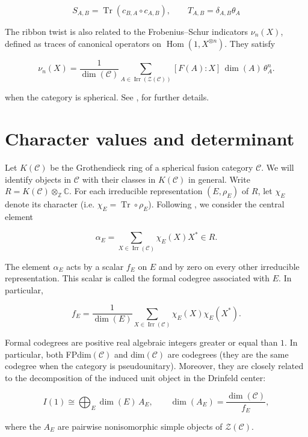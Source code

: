 \documentclass[a4paper,twoside,11pt]{amsart}
\theoremstyle{plain} %
\theoremstyle{definition}
\begin{document}
$$
S_{A,B}=\operatorname{Tr}(c_{B,A}\circ c_{A,B}),
\qquad
T_{A,B}=\delta_{A,B}\theta_A
$$


The ribbon twist is also related to the Frobenius--Schur indicators $\nu_n(X)$, defined as traces of canonical operators on $\operatorname{Hom}(1,X^{\otimes n})$. They satisfy

$$
\nu_n(X)=\frac{1}{\dim(\mathcal{C})}
\sum_{A\in\operatorname{Irr}(\mathcal{Z}(\mathcal{C}))}
[F(A):X]\,\dim(A)\,\theta_A^n.
$$
\medskip

when the category is spherical. See \cite{EGNO}, \cite{NS} for further details.




\section{Character values and determinant}

Let $K(\mathcal{C})$ be the Grothendieck ring of a spherical fusion category $\mathcal{C}$. We will identify objects in $\mathcal{C}$ with their classes in $K(\mathcal{C})$ in general. Write $R=K(\mathcal{C})\otimes_{\mathbb{Z}}\mathbb{C}$.  For each irreducible representation $(E,\rho_E)$ of $R$, let $\chi_E$ denote its character (i.e. $\chi_E=\operatorname{Tr}\circ\rho_E$). Following \cite{O1}, we consider the central element

$$
\alpha_E=\sum_{X\in\operatorname{Irr}(\mathcal{C})}\chi_E(X)X^*\in R.
$$

The element $\alpha_E$ acts by a scalar $f_E$ on $E$ and by zero on every other irreducible representation. This scalar is called the formal codegree associated with $E$. In particular,

$$
f_E=\frac{1}{\dim(E)}
\sum_{X\in\operatorname{Irr}(\mathcal{C})}
\chi_E(X)\chi_E(X^*).
$$

Formal codegrees are positive real algebraic integers greater or equal than $1$. In particular, both FPdim$(\mathcal{C})$ and dim$(\mathcal{C})$ are codegrees (they are the same codegree when the category is pseudounitary). Moreover, they are closely related to the decomposition of the induced unit object in the Drinfeld center:

$$
I({1})\cong\bigoplus_E \dim(E)\,A_E,
\qquad
\dim(A_E)=\frac{\dim(\mathcal{C})}{f_E},
$$

where the $A_E$ are pairwise nonisomorphic simple objects of $\mathcal{Z}(\mathcal{C})$.
\bigskip
\end{document}
